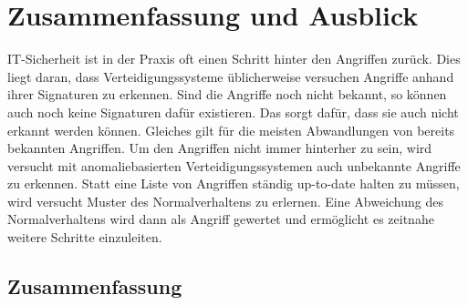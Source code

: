 \chapter{Zusammenfassung und Ausblick}\label{ch:schluss}

IT-Sicherheit ist in der Praxis oft einen Schritt hinter den Angriffen zurück.
Dies liegt daran, dass Verteidigungssysteme üblicherweise versuchen Angriffe anhand ihrer Signaturen zu erkennen.
Sind die Angriffe noch nicht bekannt, so können auch noch keine Signaturen dafür existieren.
Das sorgt dafür, dass sie auch nicht erkannt werden können.
Gleiches gilt für die meisten Abwandlungen von bereits bekannten Angriffen.
Um den Angriffen nicht immer hinterher zu sein, wird versucht mit anomaliebasierten Verteidigungssystemen auch unbekannte Angriffe zu erkennen.
Statt eine Liste von Angriffen ständig up-to-date halten zu müssen, wird versucht Muster des Normalverhaltens zu erlernen.
Eine Abweichung des Normalverhaltens wird dann als Angriff gewertet und ermöglicht es zeitnahe weitere Schritte einzuleiten.

\section{Zusammenfassung}

